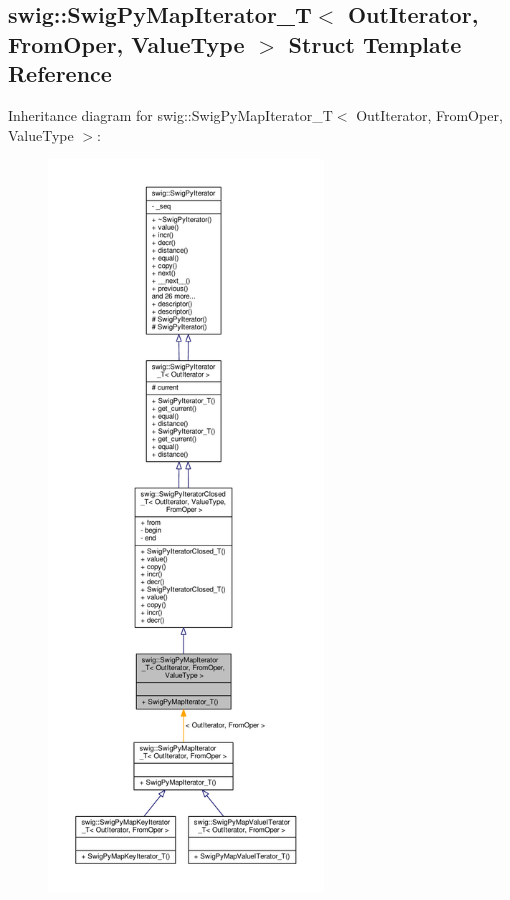 \subsection{swig\+:\+:Swig\+Py\+Map\+Iterator\+\_\+T$<$ Out\+Iterator, From\+Oper, Value\+Type $>$ Struct Template Reference}
\label{structswig_1_1SwigPyMapIterator__T}


Inheritance diagram for swig\+:\+:Swig\+Py\+Map\+Iterator\+\_\+T$<$ Out\+Iterator, From\+Oper, Value\+Type $>$\+:
\nopagebreak
\begin{figure}[H]
\begin{center}
\leavevmode
\includegraphics[height=550pt]{dc/ddd/structswig_1_1SwigPyMapIterator__T__inherit__graph}
\end{center}
\end{figure}



